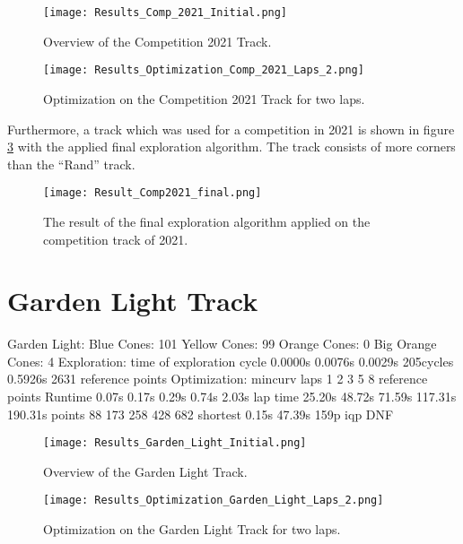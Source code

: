 \begin{figure}[H]
    \centering
    \texttt{[image: Results\_Comp\_2021\_Initial.png]}
    \caption{Overview of the Competition 2021 Track.}
    \label{fig:Results Comp 2021 Initial}
\end{figure}

\begin{figure}[H]
    \centering
    \texttt{[image: Results\_Optimization\_Comp\_2021\_Laps\_2.png]}
    \caption{Optimization on the Competition 2021 Track for two laps.}
    \label{fig:Results Comp 2021 Laps 2}
\end{figure}

Furthermore, a track which was used for a competition in 2021 is shown in figure \ref{fig:Result Comp 2021 Final} with the applied final exploration algorithm. The track consists of more corners than the ``Rand'' track.
\begin{figure}[H]
    \centering
    \texttt{[image: Result\_Comp2021\_final.png]}
    \caption{The result of the final exploration algorithm applied on the competition track of 2021.}
    \label{fig:Result Comp 2021 Final}
\end{figure}

\section{Garden Light Track} \label{sec:Results Garden Light Track}
Garden Light:
Blue Cones: 101
Yellow Cones: 99
Orange Cones: 0
Big Orange Cones: 4
Exploration:
time of exploration cycle
0.0000s 0.0076s 0.0029s 205cycles 0.5926s
2631 reference points
Optimization:
mincurv laps 1 2 3 5 8
reference points
Runtime 0.07s 0.17s 0.29s 0.74s 2.03s
lap time 25.20s 48.72s 71.59s 117.31s 190.31s
points 88 173 258 428 682
shortest 0.15s 47.39s 159p
iqp DNF

\begin{figure}[H]
    \centering
    \texttt{[image: Results\_Garden\_Light\_Initial.png]}
    \caption{Overview of the Garden Light Track.}
    \label{fig:Results Garden Light Initial}
\end{figure}

\begin{figure}[H]
    \centering
    \texttt{[image: Results\_Optimization\_Garden\_Light\_Laps\_2.png]}
    \caption{Optimization on the Garden Light Track for two laps.}
    \label{fig:Results Garden Light Laps 2}
\end{figure}


